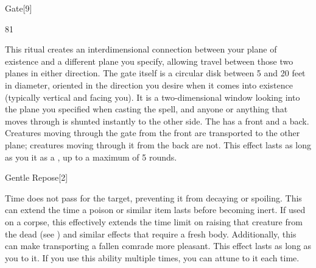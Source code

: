 \begin{spellsection}{Gate}[9]
\begin{spellcontent}
\begin{spelltargetinginfo}
\spellrng{\rngclose}
 81
\end{spelltargetinginfo}
\begin{spelleffects}
\spelleffect
This ritual creates an interdimensional connection between your plane of existence and a different plane you specify, allowing travel between those two planes in either direction.
The gate itself is a circular disk between 5 and 20 feet in diameter, oriented in the direction you desire when it comes into existence (typically vertical and facing you).
It is a two-dimensional window looking into the plane you specified when casting the spell, and anyone or anything that moves through is shunted instantly to the other side.
The  has a front and a back. Creatures moving through the gate from the front are transported to the other plane; creatures moving through it from the back are not.
This effect lasts as long as you  it as a , up to a maximum of 5 rounds.
\end{spelleffects}
\end{spellcontent}
\begin{spellfooter}
\end{spellfooter}
\begin{spellsubcontent}
\end{spellsubcontent}
\end{spellsection}
\begin{spellsection}{Gentle Repose}[2]
\begin{spellcontent}
\begin{spelltargetinginfo}
\end{spelltargetinginfo}
\begin{spelleffects}
\spelleffect
Time does not pass for the target, preventing it from decaying or spoiling.
This can extend the time a poison or similar item lasts before becoming inert.
If used on a corpse, this effectively extends the time limit on raising that creature from the dead (see ) and similar effects that require a fresh body.
Additionally, this can make transporting a fallen comrade more pleasant.
This effect lasts as long as you  to it.
If you use this ability multiple times, you can attune to it each time.
\end{spelleffects}
\end{spellcontent}
\begin{spellfooter}
\end{spellfooter}
\begin{spellsubcontent}
\end{spellsubcontent}
\end{spellsection}

